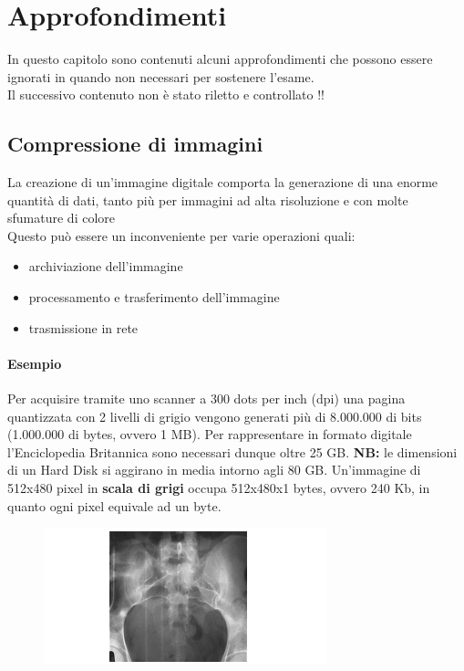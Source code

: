 \chapter{Approfondimenti}
In questo capitolo sono contenuti alcuni approfondimenti che possono essere ignorati in quando non necessari per sostenere l'esame.\\

Il successivo contenuto non è stato riletto e controllato !!

\section{Compressione di immagini}

La creazione di un'immagine digitale comporta la generazione di
una enorme quantità di dati, tanto più per immagini ad alta risoluzione e con molte sfumature di colore
\\Questo può essere un inconveniente per varie operazioni quali:

\begin{itemize}
    \item archiviazione dell'immagine
    \item processamento e trasferimento dell'immagine
    \item trasmissione in rete
\end{itemize}

\subsubsection*{Esempio}
Per acquisire tramite uno scanner a 300 dots per inch (dpi) una pagina quantizzata con 2 livelli di grigio vengono generati più di
8.000.000 di bits (1.000.000 di bytes, ovvero 1 MB). Per rappresentare in formato digitale l'Enciclopedia Britannica sono necessari dunque oltre 25 GB.
\textbf{NB:} le dimensioni di un Hard Disk si aggirano in media intorno agli
80 GB. Un'immagine di 512x480 pixel in \textbf{scala di grigi} occupa 512x480x1
bytes, ovvero 240 Kb, in quanto ogni pixel equivale ad un byte.

\begin{figure}[H]
    \centering
    \includegraphics[width=\linewidth, keepaspectratio]{capitoli/immagini/imgs/esempio-compressione-immagini.png}
\end{figure}

